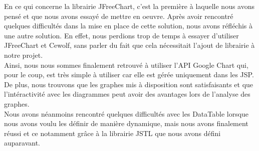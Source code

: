 En ce qui concerne la librairie JFreeChart, c'est la première à laquelle nous avons pensé et que nous avons essayé de mettre en oeuvre. Après avoir rencontré quelques difficultés dans la mise en place de cette solution, nous avons réfléchis à une autre solution. En effet, nous perdions trop de temps à essayer d'utiliser JFreeChart et Cewolf, sans parler du fait que cela nécessitait l'ajout de librairie à notre projet.\\

Ainsi, nous nous sommes finalement retrouvé à utiliser l'API Google Chart qui, pour le coup, est très simple à utiliser car elle est gérée uniquement dans les JSP. De plus, nous trouvons que les graphes mis à disposition sont satisfaisants et que l'intéractivité avec les diagrammes peut avoir des avantages lors de l'analyse des graphes.\\

Nous avons néanmoins rencontré quelques difficultés avec les DataTable lorsque nous avons voulu les définir de manière dynamique, mais nous avons finalement réussi et ce notamment grâce à la librairie JSTL que nous avons défini auparavant.